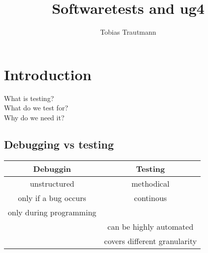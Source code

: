\documentclass[a4paper]{scrbook}
\author{Tobias Trautmann}
\title{Softwaretests and ug4}
\begin{document}
    \maketitle
    \tableofcontents
    \newpage
    \section{Introduction}
    What is testing?\\
    What do we test for?\\
    Why do we need it?
        \subsection{Debugging vs testing}
        \begin{tabular}{c|c}
            Debuggin    &  Testing  \\
            \hline
            unstructured    &   methodical  \\
            only if a bug occurs    &   continous   \\
            only during programming &   ~   \\
            ~   &   can be highly automated \\
            ~   &   covers different granularity
        \end{tabular}
\end{document}
